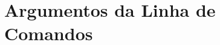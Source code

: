 \documentclass[xcolor={dvipsnames,table},aspectratio=169]{beamer}
\begin{document}

\section{Argumentos da Linha de Comandos}
\end{document}

